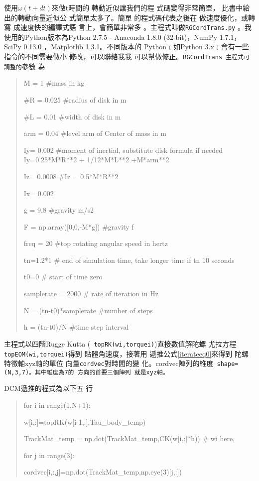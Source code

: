 \documentclass[12pt,twoside]{article}
\begin{document}
使用$\omega (t+dt)$來做t時間的%
轉動近似讓我們的程%
式碼變得非常簡單，%
比書中\cite[Page 301, Equation 10.24]{titterton}給%
出的轉動向量近似公%
式簡單太多了。簡單%
的程式碼代表之後在%
做速度優化，或轉寫%
成速度快的編譯式語%
言上，會簡單非常多%
。主程式叫做\texttt{RGCordTrans.py}%
。我使用的Python版本為Python
2.7.5 - Anaconda 1.8.0 (32-bit)，NumPy 1.7.1，SciPy 0.13.0%
，Matplotlib 1.3.1。不同版本的%
Python﹝如Python 3.x﹞會有一些%
指令的不同需要做小%
修改，可以聯絡我我%
可以幫做修正。\texttt{RGCordTrans%
主程式可調整的}參數%
為

\begin{quotation}
M = 1 \#mass in kg

\#R = 0.025 \#radius of disk in m

\#L = 0.01 \#width of disk in m

arm = 0.04 \#level arm of Center of mass in m

Iy= 0.002 \#moment of inertial, substitute disk formula if needed
Iy=0.25*M*R**2 + 1/12*M*L**2 +M*arm**2

Iz= 0.0008 \#Iz = 0.5*M*R**2

Ix= 0.002

g = 9.8 \#gravity m/s2

F = np.array([0,0,-M*g]) \#gravity f

freq = 20 \#top rotating angular speed in hertz

tn=1.2*1 \# end of simulation time, take longer time if tn \TEXTsymbol{>} 10
seconds

t0=0 \# start of time zero

samplerate = 2000 \# rate of iteration in Hz

N = (tn-t0)*samplerate \#number of steps

h = (tn-t0)/N \#time step interval
\end{quotation}

主程式以四階Rugge Kutta (\texttt{%
topRK(wi,torquei)})直接數值解陀螺%
尤拉方程\texttt{topEOM(wi,torquei)}得到%
貼體角速度，接著用%
遞推公式\ref{iterateeq0}來得到%
陀螺特徵軸xyz軸的單位%
向量\texttt{cordvec}對時間的變%
化。cordvec陣列的維度\texttt{%
shape=(N,3,7)。其中維度為7的%
方向的首要三個陣列%
就是xyz軸。}

DCM遞推的程式為以下五%
行

\begin{quotation}
for i in range(1,N+1):

w[i,:]=topRK(w[i-1,:],Tau\_body\_temp)

TrackMat\_temp = np.dot(TrackMat\_temp,CK(w[i,:]*h)) \qquad \# wi here,

for j in range(3):

cordvec[i,:,j]=np.dot(TrackMat\_temp,np.eye(3)[j,:])
\end{quotation}
\end{document}
